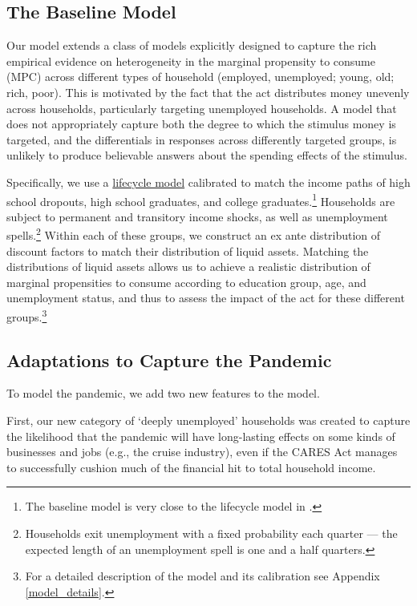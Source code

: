 \documentclass[titlepage,a4paper]{\econtex}
\begin{document}
\subsection{The Baseline Model}

Our model extends a class of models explicitly designed to capture the rich empirical evidence on heterogeneity in the marginal propensity to consume (MPC) across different types of household (employed, unemployed; young, old; rich, poor).  This is motivated by the fact that the act distributes money unevenly across households, particularly targeting unemployed households.  A model that does not appropriately capture both the degree to which the stimulus money is targeted, and the differentials in responses across differently targeted groups, is unlikely to produce believable answers about the spending effects of the stimulus.

Specifically, we use a \href{https://pubs.aeaweb.org/doi/pdfplus/10.1257/jep.15.3.3}{lifecycle model} calibrated to match the income paths of high school dropouts, high school graduates, and college graduates.\footnote{The baseline model is very close to the lifecycle model in \cite{cstwMPC}.}
Households are subject to permanent and transitory income shocks, as well as unemployment spells.\footnote{Households exit unemployment with a fixed probability each quarter --- the expected length of an unemployment spell is one and a half quarters.}
Within each of these groups, we construct an ex ante distribution of discount factors to match their distribution of liquid assets.
Matching the distributions of liquid assets allows us to achieve a realistic distribution of marginal propensities to consume according to education group, age, and unemployment status, and thus to assess the impact of the act for these different groups.\footnote{For a detailed description of the model and its calibration see Appendix \ref{model_details}.}

\subsection{Adaptations to Capture the Pandemic}

To model the pandemic, we add two new features to the model.

First, our new category of `deeply unemployed' households was created to capture the likelihood that the pandemic will have long-lasting effects on some kinds of businesses and jobs (e.g., the cruise industry), even if the CARES Act manages to successfully cushion much of the financial hit to total household income.
\end{document}
